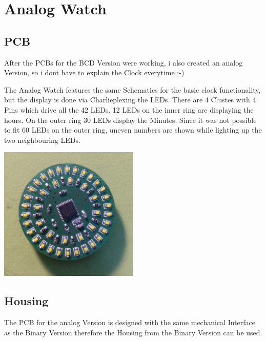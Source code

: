 \newpage
\section{Analog Watch}
\subsection{PCB}
After the PCBs for the BCD Version were working, i also created an analog Version, so i dont have to explain the Clock everytime ;-)

The Analog Watch features the same Schematics for the basic clock functionality, but the display is done via Charlieplexing the LEDs. There are 4 Clustes with 4 Pins which drive all the 42 LEDs. 12 LEDs on the inner ring are displaying the hours. On the outer ring 30 LEDs display the Minutes. Since it was not possible to fit 60 LEDs on the outer ring, uneven numbers are shown while lighting up the two neighbouring LEDs.
\begin{center}
  \includegraphics[width=0.5\textwidth]{../Pictures/AnalogPCB.jpg}
\end{center}
\newpage

\subsection{Housing}
The PCB for the analog Version is designed with the same mechanical Interface as the Binary Version therefore the Housing from the Binary Version can be used.

